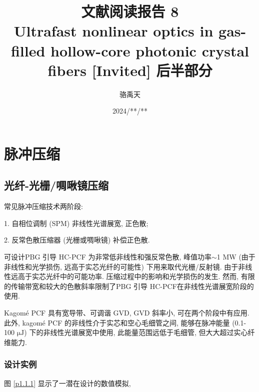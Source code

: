 \documentclass[14pt,a4paper,oneside]{article}
\title{\textbf{文献阅读报告 8\\Ultrafast nonlinear optics in gas-filled hollow-core photonic crystal fibers [Invited] 后半部分}}                           %
\author{骆禹天}                                           %
\date{2024/**/**}                                        %
\numberwithin{equation}{subsection}             %
\numberwithin{figure}{subsection}               %
\begin{document}

\maketitle

\setcounter{page}{1}          %


\tableofcontents              %

\newpage
\setcounter{page}{1}          %








\section{脉冲压缩}

\subsection{光纤-光栅/啁啾镜压缩}

常见脉冲压缩技术两阶段: 

1. 自相位调制 (SPM) 非线性光谱展宽, 正色散; 

2. 反常色散压缩器 (光栅或啁啾镜) 补偿正色散. 

可设计PBG 引导 HC-PCF 为非常低非线性和强反常色散, 峰值功率$\sim$1 MW (由于非线性和光学损伤, 远高于实芯光纤的可能性) 下用来取代光栅/反射镜. 由于非线性远高于实芯光纤中的可能功率. 压缩过程中的影响和光学损伤的发生. 然而, 有限的传输带宽和较大的色散斜率限制了PBG 引导 HC-PCF在非线性光谱展宽阶段的使用. 

Kagomé PCF 具有宽导带、可调谐 GVD, GVD 斜率小, 可在两个阶段中有应用. 此外, kagomé PCF 的非线性介于实芯和空心毛细管之间, 能够在脉冲能量 (0.1-100 $\mathrm{\mu J}$) 下的非线性光谱展宽中使用, 此能量范围远低于毛细管, 但大大超过实心纤维能力. 

\subsubsection{设计实例}

图 \ref{p1.1.1} 显示了一潜在设计的数值模拟, 
\end{document}
